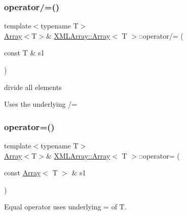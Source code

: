 \subsubsection{\texorpdfstring{operator/=()}{operator/=()}\hspace{0.1cm}{\footnotesize\ttfamily [6/6]}}
{\footnotesize\ttfamily template$<$typename T$>$ \\
\mbox{\hyperlink{classXMLArray_1_1Array}{Array}}$<$T$>$\& \mbox{\hyperlink{classXMLArray_1_1Array}{X\+M\+L\+Array\+::\+Array}}$<$ T $>$\+::operator/= (\begin{DoxyParamCaption}\item[{const T \&}]{s1 }\end{DoxyParamCaption})\hspace{0.3cm}{\ttfamily [inline]}}



divide all elements 

Uses the underlying /= \mbox{\label{classXMLArray_1_1Array_a99fd481573c47ab9a9e35ed597575b0e}} 
\subsubsection{\texorpdfstring{operator=()}{operator=()}\hspace{0.1cm}{\footnotesize\ttfamily [1/9]}}
{\footnotesize\ttfamily template$<$typename T$>$ \\
\mbox{\hyperlink{classXMLArray_1_1Array}{Array}}$<$T$>$\& \mbox{\hyperlink{classXMLArray_1_1Array}{X\+M\+L\+Array\+::\+Array}}$<$ T $>$\+::operator= (\begin{DoxyParamCaption}\item[{const \mbox{\hyperlink{classXMLArray_1_1Array}{Array}}$<$ T $>$ \&}]{s1 }\end{DoxyParamCaption})\hspace{0.3cm}{\ttfamily [inline]}}



Equal operator uses underlying = of T. 

\mbox{\label{classXMLArray_1_1Array_a99fd481573c47ab9a9e35ed597575b0e}} 
